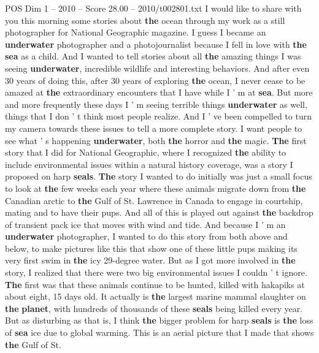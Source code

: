 \begin{textsample}{POS Dim 1 – 2010 – Score 28.00 – 2010/t002801.txt}  \label{ex:f1_pos_028}
I would like to share with you this morning some stories about \textbf{the} ocean through my work as a still photographer for National Geographic magazine.
I guess I became an \textbf{underwater} photographer and a photojournalist because I fell in love with \textbf{the} \textbf{sea} as a child.
And I wanted to tell stories about all \textbf{the} amazing things I was seeing \textbf{underwater}, incredible wildlife and interesting behaviors.
And after even 30 years of doing this, after 30 years of exploring \textbf{the} ocean, I never cease to be amazed at \textbf{the} extraordinary encounters that I have while I ' m at \textbf{sea}.
But more and more frequently these days I ' m seeing terrible things \textbf{underwater} as well, things that I don ' t think most people realize.
And I ' ve been compelled to turn my camera towards these issues to tell a more complete story.
I want people to see what ' s happening \textbf{underwater}, both \textbf{the} horror and \textbf{the} magic. \textbf{The} first story that I did for National Geographic, where I recognized \textbf{the} ability to include environmental issues within a natural history coverage, was a story I proposed on harp \textbf{seals}. \textbf{The} story I wanted to do initially was just a small focus to look at \textbf{the} few weeks each year where these animals migrate down from \textbf{the} Canadian arctic to \textbf{the} Gulf of St.
Lawrence in Canada to engage in courtship, mating and to have their pups.
And all of this is played out against \textbf{the} backdrop of transient pack ice that moves with wind and tide.
And because I ' m an \textbf{underwater} photographer, I wanted to do this story from both above and below, to make pictures like this that show one of these little pups making its very first swim in \textbf{the} icy 29-degree water.
But as I got more involved in \textbf{the} story, I realized that there were two big environmental issues I couldn ' t ignore. \textbf{The} first was that these animals continue to be hunted, killed with hakapiks at about eight, 15 days old.
It actually is \textbf{the} largest marine mammal slaughter on \textbf{the} \textbf{planet}, with hundreds of thousands of these \textbf{seals} being killed every year.
But as disturbing as that is, I think \textbf{the} bigger problem for harp \textbf{seals} is \textbf{the} loss of \textbf{sea} ice due to global warming.
This is an aerial picture that I made that shows \textbf{the} Gulf of St.

\end{textsample}
